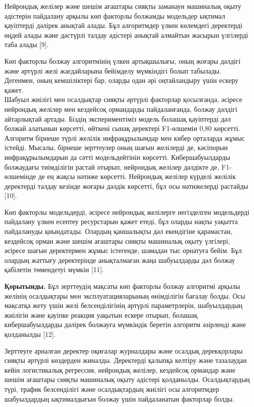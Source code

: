 \begin{multicols}{2}
Нейрондық желілер және шешім ағаштары сияқты заманауи машиналық оқыту
әдістерін пайдалану арқылы көп факторлы болжамды модельдер ықтимал
қауіптерді дәлірек анықтай алады. Бұл алгоритмдер үлкен көлемдегі
деректерді өңдей алады және дәстүрлі талдау әдістері анықтай алмайтын
жасырын үлгілерді таба алады {[}9{]}.

Көп факторлы болжау алгоритмінің үлкен артықшылығы, оның жоғары дәлдігі
және әртүрлі желі жағдайларына бейімделу мүмкіндігі болып табылады.
Дегенмен, оның кемшіліктері бар, оларды одан әрі оңтайландыру үшін
ескеру қажет.\\
Шабуыл жиілігі мен осалдықтар сияқты әртүрлі факторлар қосылғанда,
әсіресе нейрондық желілер мен кездейсоқ ормандарды пайдаланғанда, болжау
дәлдігі айтарлықтай артады. Біздің экспериментіміз модель болашақ
қауіптерді дәл болжай алатынын көрсетті, өйткені сынақ деректері
F1-өлшемін 0,80 көрсетті. Алгоритм бірнеше түрлі желілік инфрақұрылымдар
мен кибер орталарда жұмыс істейді. Мысалы, бірнеше зерттеулер оның шағын
желілерді де, кәсіпорын инфрақұрылымдарын да сәтті модельдейтінін
көрсетті. Кибершабуылдарды болжаудағы тиімділігін растай отырып,
нейрондық желілер дәлдікте де, F1-өлшемінде де ең жақсы нәтиже көрсетті.
Нейрондық желілер күрделі желілік деректерді талдау кезінде жоғары
дәлдік көрсетті, бұл осы нәтижелерді растайды {[}10{]}.

Көп факторлы модельдерді, әсіресе нейрондық желілерге негізделген
модельдерді пайдалану үлкен есептеу ресурстарын қажет етеді, бұл оларды
нақты уақытта пайдалануды қиындатады. Олардың қаншалықты дәл екендігіне
қарамастан, кездейсоқ орман және шешім ағаштары сияқты машиналық оқыту
үлгілері, әсіресе шағын деректермен жұмыс істегенде, шамадан тыс
орнатуға бейім. Бұл олардың жаттығу деректерінде анықталмаған жаңа
шабуылдарды дәл болжау қабілетін төмендетуі мүмкін {[}11{]}.

{\bfseries Қорытынды.} Бұл зерттеудің мақсаты көп факторлы болжау алгоритмі
арқылы желінің осалдықтары мен эксплуатацияларының өнімділігін бағалау
болды. Осы мақсатқа жету үшін желі белсенділігінің әртүрлі
параметрлерін, шабуылдардың жиілігін және қауіпке реакция уақытын ескере
отырып, болашақ кибершабуылдарды дәлірек болжауға мүмкіндік беретін
алгоритм әзірленді және қолданылды {[}12{]}.

Зерттеуге арналған деректер оқиғалар журналдары және осалдық
дерекқорлары сияқты әртүрлі көздерден жиналды. Деректерді қалыпқа
келтіру және тазалаудан кейін логистикалық регрессия, нейрондық желілер,
кездейсоқ ормандар және шешім ағаштары сияқты машиналық оқыту әдістері
қолданылды. Осалдықтардың түрі, трафик белсенділігі және осалдықтардың
жиілігі осы алгоритмдер шабуылдардың ықтималдығын болжау үшін
пайдаланатын факторлар болды.


\end{multicols}
